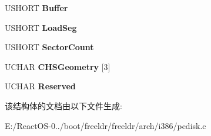 \begin{DoxyCompactItemize}
U\+S\+H\+O\+RT {\bfseries Buffer}
\item 
\mbox{\label{struct_i386___c_d_r_o_m___s_p_e_c___p_a_c_k_e_t_a06a5fb0f63f2303d73618f701a374c3d}} 
U\+S\+H\+O\+RT {\bfseries Load\+Seg}
\item 
\mbox{\label{struct_i386___c_d_r_o_m___s_p_e_c___p_a_c_k_e_t_af73a8123a770ed48b97fb9ef2fbc7f39}} 
U\+S\+H\+O\+RT {\bfseries Sector\+Count}
\item 
\mbox{\label{struct_i386___c_d_r_o_m___s_p_e_c___p_a_c_k_e_t_a87e7cc6eada84388b3419c3f892a539b}} 
U\+C\+H\+AR {\bfseries C\+H\+S\+Geometry} \mbox{[}3\mbox{]}
\item 
\mbox{\label{struct_i386___c_d_r_o_m___s_p_e_c___p_a_c_k_e_t_acd31588a5e538ed800f03d2f3f94aea6}} 
U\+C\+H\+AR {\bfseries Reserved}
\end{DoxyCompactItemize}


该结构体的文档由以下文件生成\+:\begin{DoxyCompactItemize}
\item 
E\+:/\+React\+O\+S-\/0../boot/freeldr/freeldr/arch/i386/pcdisk.\+c\end{DoxyCompactItemize}
